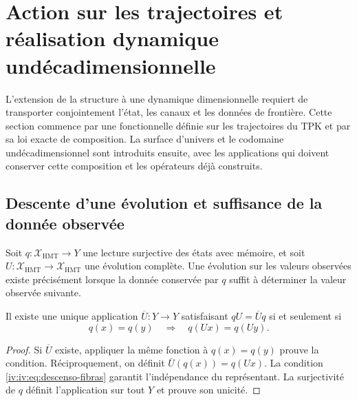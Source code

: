 \section{Action sur les trajectoires et réalisation dynamique undécadimensionnelle}
\label{iv:iv:accion-realizacion}

L’extension de la structure à une dynamique dimensionnelle requiert de
transporter conjointement l’état, les canaux et les données de
frontière. Cette section commence par une fonctionnelle définie sur
les trajectoires du TPK et par sa loi exacte de composition.
La surface d’univers et le codomaine undécadimensionnel sont
introduits ensuite, avec les applications qui doivent conserver cette
composition et les opérateurs déjà construits.

\subsection{Descente d’une évolution et suffisance de la donnée observée}

Soit \(q:\mathcal X_{\mathrm{HMT}}\to Y\) une lecture
surjective des états avec mémoire, et soit
\(U:\mathcal X_{\mathrm{HMT}}\to\mathcal X_{\mathrm{HMT}}\)
une évolution complète. Une évolution sur les valeurs
observées existe précisément lorsque la donnée conservée par
\(q\) suffit à déterminer la valeur observée suivante.

\begin{theorem}
\label{iv:iv:thm:descenso-fibras}
Il existe une unique application \(\overline U:Y\to Y\)
satisfaisant \(qU=\overline Uq\) si et seulement si
\begin{equation}
 q(x)=q(y)\quad\Longrightarrow\quad q(Ux)=q(Uy).
 \label{iv:iv:eq:descenso-fibras}
\end{equation}
\end{theorem}
\begin{proof}
Si \(\overline U\) existe, appliquer la même fonction à
\(q(x)=q(y)\) prouve la condition. Réciproquement, on
définit \(\overline U(q(x))=q(Ux)\). La condition
\eqref{iv:iv:eq:descenso-fibras} garantit l’indépendance du
représentant. La surjectivité de \(q\) définit
l’application sur tout \(Y\) et prouve son unicité.
\end{proof}

